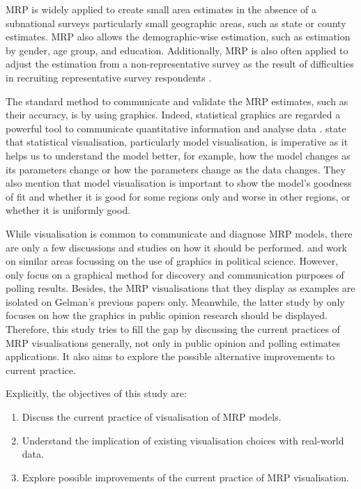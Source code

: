\documentclass{monashthesis}
\begin{document}
MRP is widely applied to create small area estimates in the absence of a subnational surveys \autocite{hanretty} particularly small geographic areas, such as state or county estimates. MRP also allows the demographic-wise estimation, such as estimation by gender, age group, and education. Additionally, MRP is also often applied to adjust the estimation from a non-representative survey as the result of difficulties in recruiting representative survey respondents \autocite{mrp-book}.

The standard method to communicate and validate the MRP estimates, such as their accuracy, is by using graphics. Indeed, statistical graphics are regarded a powerful tool to communicate quantitative information and analyse data \autocite{ClevelandWilliamS,1983Gmfd}. \textcite{WickhamHadley2015VsmR} state that statistical visualisation, particularly model visualisation, is imperative as it helps us to understand the model better, for example, how the model changes as its parameters change or how the parameters change as the data changes. They also mention that model visualisation is important to show the model's goodness of fit and whether it is good for some regions only and worse in other regions, or whether it is uniformly good.

While visualisation is common to communicate and diagnose MRP models, there are only a few discussions and studies on how it should be performed. \textcite{mekelagelman} and \textcite{saundra} work on similar areas focussing on the use of graphics in political science. However, \textcite{mekelagelman} only focus on a graphical method for discovery and communication purposes of polling results. Besides, the MRP visualisations that they display as examples are isolated on Gelman's previous papers only. Meanwhile, the latter study by \textcite{saundra} only focuses on how the graphics in public opinion research should be displayed. Therefore, this study tries to fill the gap by discussing the current practices of MRP visualisations generally, not only in public opinion and polling estimates applications. It also aims to explore the possible alternative improvements to current practice.

Explicitly, the objectives of this study are:

\begin{enumerate}
\def\labelenumi{\arabic{enumi}.}
\tightlist
\item
  Discuss the current practice of visualisation of MRP models.
\item
  Understand the implication of existing visualisation choices with real-world data.
\item
  Explore possible improvements of the current practice of MRP visualisation.
\end{enumerate}
\end{document}
